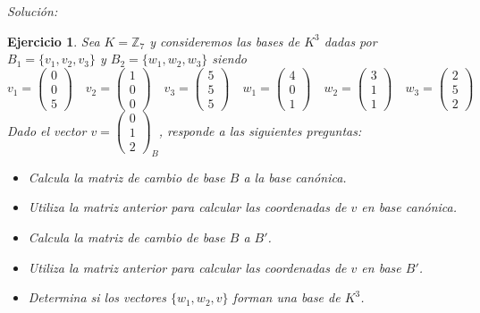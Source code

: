 \documentclass{amsart}
\newtheorem{ejer}{Ejercicio}
\begin{document}
{\it Solución: }



\begin{ejer}
Sea $K = {\mathbb Z}_{7}$ y consideremos las bases de $K^3$ dadas por
$ B_1 = \{v_1,v_2,v_3\}$ y $B_2 = \{w_1,w_2,w_3\}$
siendo 
$$
v_1 = \left(\begin{array}{r}
0 \\
0 \\
5
\end{array}\right) \quad 
v_2 = \left(\begin{array}{r}
1 \\
0 \\
0
\end{array}\right) \quad
v_3 = \left(\begin{array}{r}
5 \\
5 \\
5
\end{array}\right)
\quad
w_1 = \left(\begin{array}{r}
4 \\
0 \\
1
\end{array}\right) \quad
w_2 = \left(\begin{array}{r}
3 \\
1 \\
1
\end{array}\right) \quad
w_3 = \left(\begin{array}{r}
2 \\
5 \\
2
\end{array}\right)
$$
Dado el vector $v = \left(\begin{array}{r}
0 \\
1 \\
2
\end{array}\right)_B$, responde a las siguientes preguntas:
\begin{itemize}
\item Calcula la matriz de cambio de base $B$ a la base canónica.
\item Utiliza la matriz anterior para calcular las coordenadas de
$v$ en base canónica.
\item Calcula la matriz de cambio de base $B$ a $B'$.
\item Utiliza la matriz anterior para calcular las coordenadas de
$v$ en base $B'$.
\item Determina si los vectores $\{w_1,w_2,v\}$ forman una base
de $K^3$.
\end{itemize}
\end{ejer}
\end{document}
